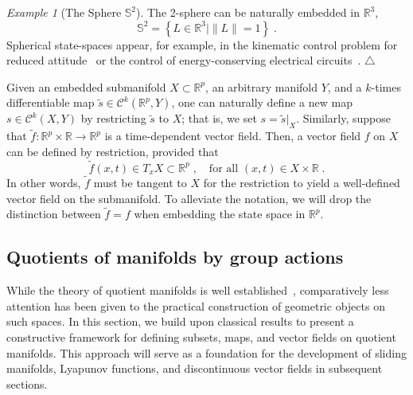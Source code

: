 \documentclass{article}
\theoremstyle{definition}
\theoremstyle{remark}
\newtheorem{example}{Example}
\newcommand\xqed[1]{%
  \leavevmode\unskip\penalty9999 \hbox{}\nobreak\hfill
  \quad\hbox{#1}}
\newcommand\eexa{\xqed{$\triangle$}}
\newcommand{\CO}{\mathcal{C}}	%
\newcommand{\MA}{X}	%
\newcommand{\MAp}{Y}	%
\newcommand{\RR}{\mathbb{R}}	%
\newcommand{\SP}{\mathbb{S}}	%
\begin{document}
\begin{example}[The Sphere $\SP^2$] 
 The 2-sphere can be naturally embedded in $\RR^3$,
 \begin{displaymath}
  \SP^2 = \left\{ L \in \RR^3 \mid \|L\| = 1 \right\} \;.
 \end{displaymath}
 Spherical state-spaces appear, for example, in the kinematic control problem for reduced
 attitude~\cite{brockett1972,bullo1995} or the control of energy-conserving electrical circuits~\cite{sira1988}. 
 \eexa
\end{example}

Given an embedded submanifold $\MA \subset \RR^p$, an arbitrary manifold $\MAp$, and a $k$-times differentiable map 
$\tilde{s} \in \CO^k(\RR^p,\MAp)$, one can naturally define a new map $s \in \CO^k(\MA,\MAp)$ by restricting $\tilde{s}$
to $\MA$; that is, we set $s = \tilde{s}\big|_\MA$. Similarly, suppose that $\tilde{f} : \RR^p\times\RR \to \RR^p$ is a
time-dependent vector field. Then, a vector field $f$ on $\MA$ can be defined by restriction, provided that
\begin{equation} \label{eq:vf_restriction}
 \tilde{f}(x,t) \in T_x \MA \subset \RR^p \;, \quad \text{for all $(x,t) \in \MA\times\RR$} \;.
\end{equation}
In other words, $\tilde{f}$ must be tangent to $\MA$ for the restriction to yield a well-defined vector field on the submanifold.
To alleviate the notation, we will drop the distinction between $\tilde{f} = f$ when embedding the state space in
$\RR^p$. 

\subsection{Quotients of manifolds by group actions}

While the theory of quotient manifolds is well established~\cite[Ch. 21]{lee}, comparatively less attention has been given
to the practical construction of geometric objects on such spaces. In this section, we build upon classical results to present a
 constructive framework for defining subsets, maps, and vector fields on quotient manifolds. This approach will serve as a
foundation for the development of sliding manifolds, Lyapunov functions, and discontinuous vector fields in subsequent sections.
\end{document}
